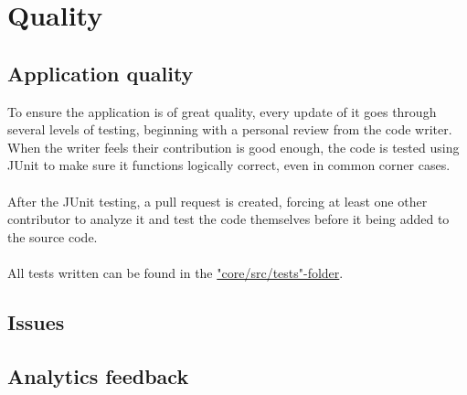 \section{Quality}
\begin{comment}
	\begin{itemize}
		\item Describe how you test your application and where to find these tests. If
			  applicable, give a link to your continuous integration.
		\item List all known issues.
		\item Run analytical tools on your software and show the results. Use for example:
			  \begin{itemize}
				  \item Dependencies: \href{http://stan4j.com/}{STAN} or similar.
				  \item Quality tool reports, like \href{http://filehippo.com/download_pmd/}{PMD}.
			  \end{itemize}
	\end{itemize}

	NOTE: Each Java, XML, etc. file should have a header comment: Author,
	responsibility, used by ..., uses ..., etc.
\end{comment}
\subsection{Application quality}
To ensure the application is of great quality, every update of it goes through several levels of testing, beginning with a personal review from the code writer. When the writer feels their contribution is good enough, the code is tested using JUnit\cite{JUnit} to make sure it functions logically correct, even in common corner cases.\\
\\
After the JUnit testing, a pull request is created, forcing at least one other contributor to analyze it and test the code themselves before it being added to the source code.\\
\\
All tests written can be found in the \href{https://github.com/Krysset/TDA367-Projektgrupp-16/tree/main/core/src/test/java/com/g16/feyrune}{"core/src/tests"-folder}.

\subsection{Issues}


\subsection{Analytics feedback}

\begin{comment}
\subsection{Access control and security}
This section shan't be needed
\end{comment}